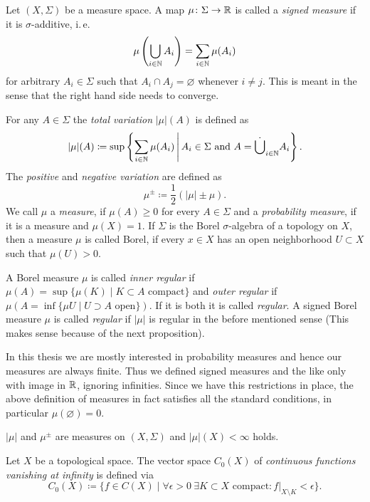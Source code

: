 \begin{defin}
  Let \((X, \Sigma)\) be a measure space. A map \(\mu \colon \Sigma \to \mathbb{R}\) is called a \emph{signed measure} if it is \(\sigma\)-additive, i.\,e.
  \[
    \mu\left(\bigcup_{i \in \mathbb{N}}A_i \right) = \sum_{i \in \mathbb{N}} \mu(A_i)
  \]
  for arbitrary \(A_i \in \Sigma\) such that \(A_i \cap A_j = \varnothing\) whenever \(i \neq j\). This is meant in the sense that the right hand side needs to converge.

  For any \(A \in \Sigma\) the \emph{total variation} \(|\mu|(A)\) is defined as
  \[
    |\mu|(A) \coloneqq \sup \left\{\sum_{i \in \mathbb{N}} \mu(A_i) \,\middle|\, A_i \in \Sigma \text{ and } A = \dot \bigcup_{i \in \mathbb{N}} A_i \right \}.
  \]
  The \emph{positive} and \emph{negative variation} are defined as
  \[
    \mu^\pm \coloneqq \frac12 (|\mu| \pm \mu).
  \]
  We call \(\mu\) a \emph{measure}, if \(\mu(A) \geq 0\) for every \(A \in \Sigma\) and a \emph{probability measure}, if it is a measure and \(\mu(X) = 1\). If \(\Sigma\) is the Borel \(\sigma\)-algebra of a topology on \(X\), then a measure \(\mu\) is called Borel, if every \(x \in X\) has an open neighborhood \(U \subset X\) such that \(\mu(U) > 0\).
  
  A Borel measure \(\mu\) is called \emph{inner regular} if \(\mu(A) = \sup \{ \mu(K) \mid K \subset A \text{ compact}\}\) and \emph{outer regular} if \(\mu(A = \inf \{ \mu{U} \mid U \supset A \text{ open}\})\). If it is both it is called \emph{regular}. A signed Borel measure \(\mu\) is called \emph{regular} if \(|\mu|\) is regular in the before mentioned sense (This makes sense because of the next proposition).
\end{defin}

\begin{rem}
  In this thesis we are mostly interested in probability measures and hence our measures are always finite. Thus we defined signed measures and the like only with image in \(\mathbb{R}\), ignoring infinities. Since we have this restrictions in place, the above definition of measures in fact satisfies all the standard conditions, in particular \(\mu(\varnothing) = 0\).
\end{rem}

\begin{prop}
  \(|\mu|\) and \(\mu^\pm\) are measures on \((X, \Sigma)\) and \(|\mu|(X) < \infty\) holds.
\end{prop}

\begin{defin}
  \label{def:vanishing}
  Let \(X\) be a topological space. The vector space \(C_0(X)\) of \emph{continuous functions vanishing at infinity} is defined via
  \[
    C_0(X) \coloneqq \{f \in C(X) \mid \forall \epsilon > 0\ \exists K \subset X \text{ compact}\colon f|_{X\setminus K} < \epsilon\}.
  \]
\end{defin}

